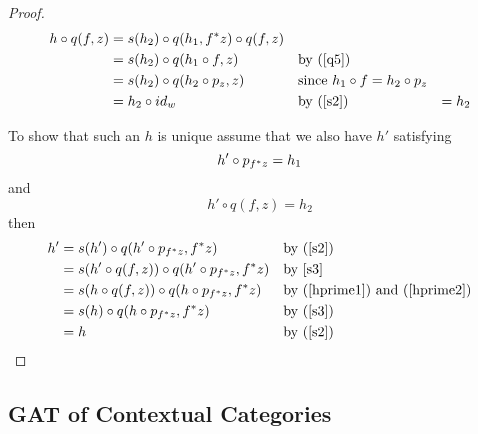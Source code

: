 \documentclass[10pt,a4paper]{scrartcl}
\begin{document}
\begin{proof}
\begin{align*}
h \circ q(f,z)
                 & = s(h_2) \circ q(h_1,f ^* z) \circ q(f,z) &\\
                 & = s(h_2) \circ q(h_1 \circ f,z)   &&\mbox{by (\ref{q5})}\\
								 & = s(h_2) \circ q(h_2 \circ p_z ,z)&&\mbox{since }h_1 \circ f = h_2 \circ p_z \\
                 & = h_2  \circ id_w                 &&\mbox{by (\ref{s2})}
								 & = h_2
\end{align*}

\noindent 
To show that such an $h$ is unique assume that we also have $h'$ satisfying
\begin{equation}
\label{hprime1}
h' \circ p_{f ^* z} = h_1
\end{equation}
and
\begin{equation}
\label{hprime2}
h' \circ q(f,z) = h_2
\end{equation}
\noindent then
\begin{align*}
h'
        & = s(h')              \circ q(h' \circ p_{f ^* z},f ^* z) &&\mbox{by (\ref{s2})}\\
			  & = s(h' \circ q(f,z)) \circ q(h' \circ p_{f ^* z},f ^* z)&&\mbox{by \ref{s3} }\\
        & = s(h  \circ q(f,z)) \circ q(h \circ p_{f ^* z},f ^* z) &&\mbox{by (\ref{hprime1}) and (\ref{hprime2})} \\
				& = s(h)               \circ q(h \circ p_{f ^* z},f ^* z) &&\mbox{by (\ref{s3})}\\
				& = h                                                         &&\mbox{by (\ref{s2})}
\end{align*}
\end{proof}

\subsection{GAT of Contextual Categories}
\end{document}
